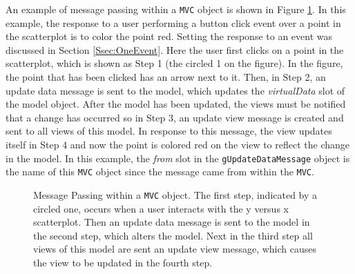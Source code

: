 \documentclass{article}[11pt]
\newcommand{\Robject}[1]{{\texttt{#1}}}
\newcommand{\Rslot}[1]{\textsl{#1}}
\begin{document}

An example of message passing within a \Robject{MVC} object is shown in Figure
\ref{Fig:MPwithin}.  In this example, the response to a user performing a
button click event over a point in the scatterplot is to color the point red.
Setting the response to an event was discussed in Section
\ref{Ssec:OneEvent}.  Here the user first clicks on a point in the
scatterplot, which is shown as Step 1 (the circled 1 on the figure).  In the
figure, the point that has been clicked has an arrow next to it.  Then, in
Step 2, an update data message is sent to the model, which updates
the \Rslot{virtualData} slot of the model object.  After the
model has been updated, the views must be notified that a
change has occurred so in Step 3, an update view message is created and sent
to all views of this model.  In response to this
message, the view updates itself in Step 4 and now the
point is colored red on the view to reflect the change in the
model.  In this example, the \Rslot{from} slot in the
\Robject{gUpdateDataMessage} object is the name of this \Robject{MVC} object
since the message came from within the \Robject{MVC}. 

\begin{figure}[ht]
  \begin{center}
    \caption{ Message Passing within a \Robject{MVC} object.  The first step,
      indicated by a circled one, occurs when a user interacts with the y
      versus x scatterplot.  Then an update data message is sent to the model
      in the second step, which alters the model.  Next in the third step all
      views of this model are sent an update view message, which causes the
      view to be updated in the fourth step. }
    \label{Fig:MPwithin}
  \end{center}
\end{figure}
\end{document}
